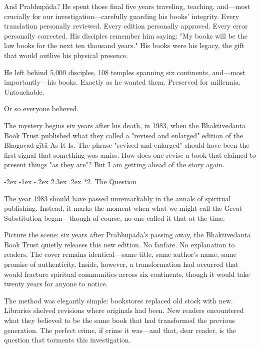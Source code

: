 \documentclass[12pt,twoside]{book}
\makeatletter
\def\cleardoublepage{\clearpage\if@twoside \ifodd\c@page\else\hbox{}\thispagestyle{empty}\newpage\if@twocolumn\hbox{}\newpage\fi\fi\fi}
\renewcommand\section{\@startsection{section}{1}{\z@}%
{-2ex \@plus -1ex \@minus -.2ex}%
{2.3ex \@plus.2ex}%
{\normalfont\Large\bfseries}}
\makeatother
\begin{document}
And Prabhupāda? He spent those final five years traveling, teaching, and—most crucially for our investigation—carefully guarding his books' integrity. Every translation personally reviewed. Every edition personally approved. Every error personally corrected. His disciples remember him saying: "My books will be the law books for the next ten thousand years." His books were his legacy, the gift that would outlive his physical presence.

He left behind 5,000 disciples, 108 temples spanning six continents, and—most importantly—his books. Exactly as he wanted them. Preserved for millennia. Untouchable.

Or so everyone believed.

The mystery begins six years after his death, in 1983, when the Bhaktivedanta Book Trust published what they called a "revised and enlarged" edition of the Bhagavad-gītā As It Is. The phrase "revised and enlarged" should have been the first signal that something was amiss. How does one revise a book that claimed to present things "as they are"? But I am getting ahead of the story again.

\cleardoublepage
\vspace*{0.20\textheight}
\section*{2. The Question}
\thispagestyle{chapterpage}

\normalfont\justifying
The year 1983 should have passed unremarkably in the annals of spiritual publishing. Instead, it marks the moment when what we might call the Great Substitution began—though of course, no one called it that at the time.

Picture the scene: six years after Prabhupāda's passing away, the Bhaktivedanta Book Trust quietly releases this new edition. No fanfare. No explanation to readers. The cover remains identical—same title, same author's name, same promise of authenticity. Inside, however, a transformation had occurred that would fracture spiritual communities across six continents, though it would take twenty years for anyone to notice.

The method was elegantly simple: bookstores replaced old stock with new. Libraries shelved revisions where originals had been. New readers encountered what they believed to be the same book that had transformed the previous generation. The perfect crime, if crime it was—and that, dear reader, is the question that torments this investigation.
\end{document}
